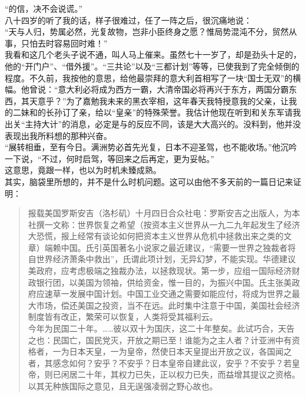 “的信，决不会说谎。”\\

八十四岁的听了我的话，样子很难过，任了一阵之后，很沉痛地说：\\

“天与人归，势属必然，光复故物，岂非小臣终身之愿？惟局势混沌不分，贸然从事，只怕去时容易回时难！”\\

我看和这几个老头子说不通，叫人马上催来。虽然七十一岁了，却是劲头十足的，他的“开门户”、“借外援”。“三共论”以及“三都计划”等等，已使我到了完全倾倒的程度。不久前，我按他的意思，给他最崇拜的意大利首相写了一块“国士无双”的横幅。他曾说：“意大利必将成为西方一霸，大清帝国必将再兴于东方，两国分霸东西，其天意乎？”为了嘉勉我未来的黑衣宰相，这年春天我特授意我的父亲，让我的二妹和的长孙订了亲，给以“皇亲”的特殊荣誉。我估计他现在听到和关东军请我出关“主持大计”的消息，必定是与的反应不同，该是大大高兴的。没料到，他并没表现出我所料想的那种兴奋。\\

“展转相垂，至有今日。满洲势必首先光复，日本不迎圣驾，也不能收场。”他沉吟一下说，“不过，何时启驾，等回来之后再定，更为妥帖。”\\

这意思，竟跟一样，也以为时机未臻成熟。\\

其实，脑袋里所想的，并不是什么时机问题。这可以由他不多天前的一篇日记来证明：\\

\begin{quote}
	报载美国罗斯安吉（洛杉矶）十月四日合众社电：罗斯安吉之出版人，为本社撰一文称：世界恢复之希望（按资本主义世界从一九二九年起发生了经济大恐慌，报上经常有谈论如何把资本主义世界从危机中拯救出来之类的文章）端赖中国。氏引英国著名小说家之最近建议，“需要一世界之独裁者将自世界经济萧条中救出”，氏谓此项计划，无异幻梦，不能实现。华德建议美政府，应考虑极端之独裁办法，以拯救现状。第一步，应组一国际经济财政银行团，以美国为领袖，供给资金，惟一目的，为振兴中国。氏主张美政府应速草一发展中国计划。中国工业交通之需要如能应付，将成为世界之最大市场，偿还美国之投资，当不在远。此时集中注意于中国，美国社会经济制度皆有改正，繁荣可以恢复，人类将受其福利云。\\

今年为民国二十年。……彼以双十为国庆，这二十年整矣。此试巧合，天告之也：民国亡，国民党灭，开放之期已至！谁能为之主人者？计亚洲中有资格者，一为日本天皇，一为皇帝，然使日本天皇提出开放之议，各国闻之者，其感念如何？安乎？不安乎？日本皇帝自建此议，安乎？不安乎？若皇帝，则已闲居二十年，其权力已失，正以权力已失，而益增其提议之资格。以其无种族国际之意见，且无逞强凌弱之野心故也。\\
\end{quote}

